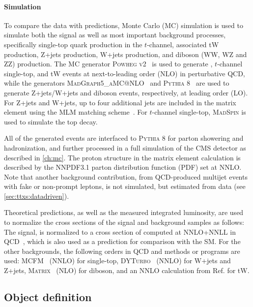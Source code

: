 \paragraph{Simulation}
To compare the data with predictions, Monte Carlo (MC) simulation is used to simulate both the \ttbar signal as well as most important background processes, specifically single-top quark production in the $t$-channel, associated tW production, Z+jets production, W+jets production, and diboson (WW, WZ and ZZ) production. The MC generator \textsc{Powheg v2}~\cite{Powheg:2004, Powheg:2007, Powheg:2010} is used to generate \ttbar, $t$-channel single-top, and tW events at next-to-leading order (NLO) in perturbative QCD, while the generators \textsc{MadGraph5\_aMC@NLO}~\cite{MG5aMCatNLO:2014} and \textsc{Pythia 8}~\cite{Pythia:2015} are used to generate Z+jets/W+jets and diboson events, respectively, at leading order (LO). For Z+jets and W+jets, up to four additional jets are included in the matrix element using the MLM matching scheme~\cite{Mangano:2006rw}. For $t$-channel single-top, \textsc{MadSpin} is used to simulate the top decay.

All of the generated events are interfaced to \textsc{Pythia 8} for parton showering and hadronization, and further processed in a full simulation of the CMS detector as described in \cref{ch:mc}. The proton structure in the matrix element calculation is described by the NNPDF3.1 parton distribution function (PDF) set at NNLO. Note that another background contribution, from QCD-produced multijet events with fake or non-prompt leptons, is not simulated, but estimated from data (see \cref{sec:ttxs:datadriven}).

Theoretical predictions, as well as the measured integrated luminosity, are used to normalize the cross sections of the signal and background samples as follows: The \ttbar signal, is normalized to a cross section of \xsecpred computed at NNLO+NNLL in QCD~\cite{Czakon:2011xx}, which is also used as a prediction for comparison with the SM. For the other backgrounds, the following orders in QCD and methods or programs are used: \textsc{MCFM}~\cite{Campbell:2020fhf} (NNLO) for single-top, \textsc{DYTurbo}~\cite{Camarda:2019zyx} (NNLO) for W+jets and Z+jets, \textsc{Matrix}~\cite{Grazzini:2017mhc} (NLO) for diboson, and an NNLO calculation from Ref. \cite{Kidonakis:2021vob} for tW.


\subsection{Object definition}
\label{sec:ttxs:objects}


